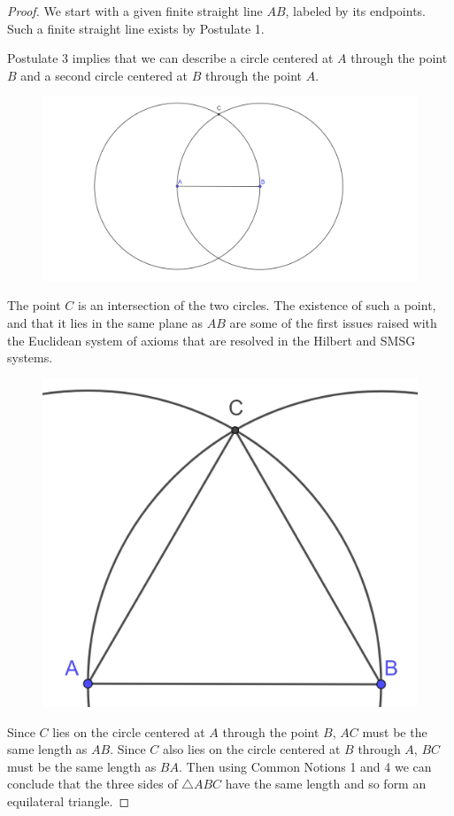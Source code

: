 \documentclass[
]{book}
\theoremstyle{definition}
\theoremstyle{definition}
\theoremstyle{definition}
\theoremstyle{definition}
\theoremstyle{remark}
\begin{document}
\begin{proof}
We start with a given finite straight line \(AB\), labeled by its endpoints. Such a finite straight line exists by Postulate 1.

Postulate 3 implies that we can describe a circle centered at \(A\) through the point \(B\) and a second circle centered at \(B\) through the point \(A\).

\begin{figure}

{\centering \includegraphics[width=0.9\linewidth]{images/Prop1b} 

}

\end{figure}

The point \(C\) is an intersection of the two circles. The existence of such a point, and that it lies in the same plane as \(AB\) are some of the first issues raised with the Euclidean system of axioms that are resolved in the Hilbert and SMSG systems.

\begin{figure}

{\centering \includegraphics[width=0.25\linewidth]{images/Prop1c} 

}

\end{figure}

Since \(C\) lies on the circle centered at \(A\) through the point \(B\), \(AC\) must be the same length as \(AB\). Since \(C\) also lies on the circle centered at \(B\) through \(A\), \(BC\) must be the same length as \(BA\). Then using Common Notions 1 and 4 we can conclude that the three sides of \(\triangle ABC\) have the same length and so form an equilateral triangle.
\end{proof}
\end{document}
